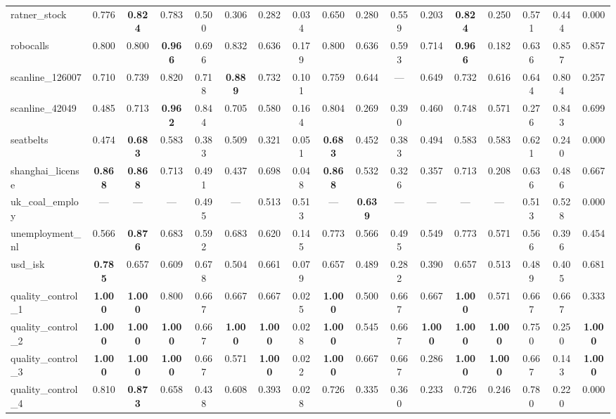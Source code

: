 \documentclass[11pt,a4paper]{article}
\begin{document}
\begin{table}
{\begin{tabular}{lcccccccccccccccc}
ratner\_stock & 0.776 & \textbf{0.824} & 0.783 & 0.500 & 0.306 & 0.282 & 0.034 & 0.650 & 0.280 & 0.559 & 0.203 & \textbf{0.824} & 0.250 & 0.571 & 0.444 & 0.000 \\
robocalls & 0.800 & 0.800 & \textbf{0.966} & 0.696 & 0.832 & 0.636 & 0.179 & 0.800 & 0.636 & 0.593 & 0.714 & \textbf{0.966} & 0.182 & 0.636 & 0.857 & 0.857 \\
scanline\_126007 & 0.710 & 0.739 & 0.820 & 0.718 & \textbf{0.889} & 0.732 & 0.101 & 0.759 & 0.644 & — & 0.649 & 0.732 & 0.616 & 0.644 & 0.804 & 0.257 \\
scanline\_42049 & 0.485 & 0.713 & \textbf{0.962} & 0.844 & 0.705 & 0.580 & 0.164 & 0.804 & 0.269 & 0.390 & 0.460 & 0.748 & 0.571 & 0.276 & 0.843 & 0.699 \\
seatbelts & 0.474 & \textbf{0.683} & 0.583 & 0.383 & 0.509 & 0.321 & 0.051 & \textbf{0.683} & 0.452 & 0.383 & 0.494 & 0.583 & 0.583 & 0.621 & 0.240 & 0.000 \\
shanghai\_license & \textbf{0.868} & \textbf{0.868} & 0.713 & 0.491 & 0.437 & 0.698 & 0.048 & \textbf{0.868} & 0.532 & 0.326 & 0.357 & 0.713 & 0.208 & 0.636 & 0.486 & 0.667 \\
uk\_coal\_employ & — & — & — & 0.495 & — & 0.513 & 0.513 & — & \textbf{0.639} & — & — & — & — & 0.513 & 0.528 & 0.000 \\
unemployment\_nl & 0.566 & \textbf{0.876} & 0.683 & 0.592 & 0.683 & 0.620 & 0.145 & 0.773 & 0.566 & 0.495 & 0.549 & 0.773 & 0.571 & 0.566 & 0.396 & 0.454 \\
usd\_isk & \textbf{0.785} & 0.657 & 0.609 & 0.678 & 0.504 & 0.661 & 0.079 & 0.657 & 0.489 & 0.282 & 0.390 & 0.657 & 0.513 & 0.489 & 0.405 & 0.681 \\
quality\_control\_1 & \textbf{1.000} & \textbf{1.000} & 0.800 & 0.667 & 0.667 & 0.667 & 0.025 & \textbf{1.000} & 0.500 & 0.667 & 0.667 & \textbf{1.000} & 0.571 & 0.667 & 0.667 & 0.333 \\
quality\_control\_2 & \textbf{1.000} & \textbf{1.000} & \textbf{1.000} & 0.667 & \textbf{1.000} & \textbf{1.000} & 0.028 & \textbf{1.000} & 0.545 & 0.667 & \textbf{1.000} & \textbf{1.000} & \textbf{1.000} & 0.750 & 0.250 & \textbf{1.000} \\
quality\_control\_3 & \textbf{1.000} & \textbf{1.000} & \textbf{1.000} & 0.667 & 0.571 & \textbf{1.000} & 0.022 & \textbf{1.000} & 0.667 & 0.667 & 0.286 & \textbf{1.000} & \textbf{1.000} & 0.667 & 0.143 & \textbf{1.000} \\
quality\_control\_4 & 0.810 & \textbf{0.873} & 0.658 & 0.438 & 0.608 & 0.393 & 0.028 & 0.726 & 0.335 & 0.360 & 0.233 & 0.726 & 0.246 & 0.780 & 0.220 & 0.000 \\

\end{tabular}}
\end{table}
\end{document}
